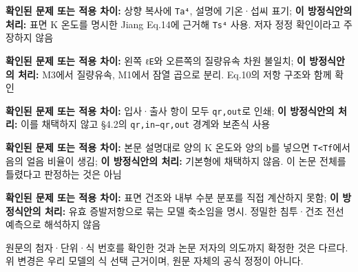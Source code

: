 \documentclass[11pt,a4paper]{article}
\begin{document}
\begin{description}[leftmargin=0pt,style=nextline]
\item[Cortes Eq.16] \textbf{확인된 문제 또는 적용 차이:} 상향 복사에 \texttt{Ta⁴}, 설명에 기온·섭씨 표기; \textbf{이 방정식안의 처리:} 표면 K 온도를 명시한 Jiang Eq.14에 근거해 \texttt{Ts⁴} 사용. 저자 정정 확인이라고 주장하지 않음
\item[Cortes Eq.19] \textbf{확인된 문제 또는 적용 차이:} 왼쪽 \texttt{ℓE}와 오른쪽의 질량유속 차원 불일치; \textbf{이 방정식안의 처리:} M3에서 질량유속, M1에서 잠열 곱으로 분리. Eq.10의 저항 구조와 함께 확인
\item[Dong Eq.25] \textbf{확인된 문제 또는 적용 차이:} 입사·출사 항이 모두 \texttt{qr,out}로 인쇄; \textbf{이 방정식안의 처리:} 이를 채택하지 않고 §4.2의 \texttt{qr,in−qr,out} 경계와 보존식 사용
\item[Jiang Eq.11] \textbf{확인된 문제 또는 적용 차이:} 본문 설명대로 양의 K 온도와 양의 \texttt{b}를 넣으면 \texttt{T<Tf}에서 음의 얼음 비율이 생김; \textbf{이 방정식안의 처리:} 기본형에 채택하지 않음. 이 논문 전체를 틀렸다고 판정하는 것은 아님
\item[상세 1차원 수분모델 → 저장소 하나] \textbf{확인된 문제 또는 적용 차이:} 표면 건조와 내부 수분 분포를 직접 계산하지 못함; \textbf{이 방정식안의 처리:} 유효 증발저항으로 묶는 모델 축소임을 명시. 정밀한 침투·건조 전선 예측으로 해석하지 않음
\end{description}

원문의 첨자·단위·식 번호를 확인한 것과 논문 저자의 의도까지 확정한 것은 다르다. 위 변경은 우리 모델의 식 선택 근거이며, 원문 자체의 공식 정정이 아니다.
\end{document}
